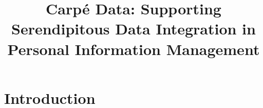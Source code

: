 \documentclass{sigchi}
\begin{document}
\title{Carp\'{e} Data: Supporting Serendipitous Data Integration in Personal Information Management}



\maketitle

\begin{abstract}
\end{abstract}

\keywords{}



\section{Introduction}
\end{document}

